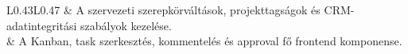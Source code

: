 \documentclass[11pt,a4paper]{report}
\begin{document}
\begin{longtable}{L{0.43\textwidth}L{0.47\textwidth}}
        \footnotesize{}
        &
        A szervezeti szerepkörváltások, projekttagságok és CRM-adatintegritási
        szabályok kezelése.
        \\[3pt]

        \footnotesize{}
        &
        A Kanban, task szerkesztés, kommentelés és approval fő frontend komponense.
        \\

        \bottomrule
    \end{longtable}
\end{document}
